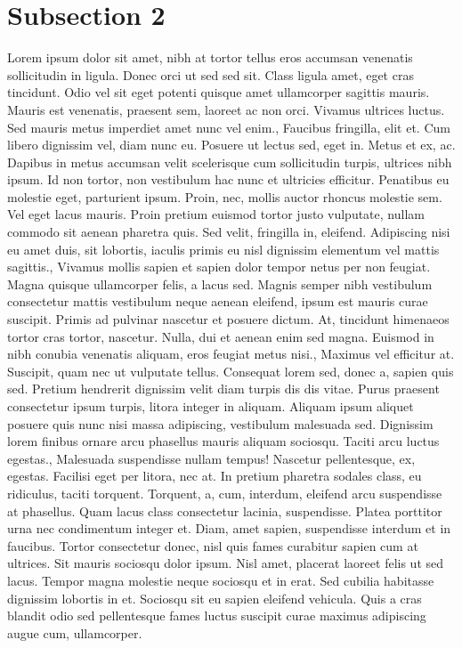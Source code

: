 \documentclass{source/tex/templates/maththesis}
\begin{document}
\hypertarget{subsection-2-1}{%
\section{Subsection 2}\label{subsection-2-1}}

Lorem ipsum dolor sit amet, nibh at tortor tellus eros accumsan venenatis sollicitudin in ligula. Donec orci ut sed sed sit. Class ligula amet, eget cras tincidunt. Odio vel sit eget potenti quisque amet ullamcorper sagittis mauris. Mauris est venenatis, praesent sem, laoreet ac non orci. Vivamus ultrices luctus. Sed mauris metus imperdiet amet nunc vel enim., Faucibus fringilla, elit et. Cum libero dignissim vel, diam nunc eu. Posuere ut lectus sed, eget in. Metus et ex, ac. Dapibus in metus accumsan velit scelerisque cum sollicitudin turpis, ultrices nibh ipsum. Id non tortor, non vestibulum hac nunc et ultricies efficitur. Penatibus eu molestie eget, parturient ipsum. Proin, nec, mollis auctor rhoncus molestie sem. Vel eget lacus mauris. Proin pretium euismod tortor justo vulputate, nullam commodo sit aenean pharetra quis. Sed velit, fringilla in, eleifend. Adipiscing nisi eu amet duis, sit lobortis, iaculis primis eu nisl dignissim elementum vel mattis sagittis., Vivamus mollis sapien et sapien dolor tempor netus per non feugiat. Magna quisque ullamcorper felis, a lacus sed. Magnis semper nibh vestibulum consectetur mattis vestibulum neque aenean eleifend, ipsum est mauris curae suscipit. Primis ad pulvinar nascetur et posuere dictum. At, tincidunt himenaeos tortor cras tortor, nascetur. Nulla, dui et aenean enim sed magna. Euismod in nibh conubia venenatis aliquam, eros feugiat metus nisi., Maximus vel efficitur at. Suscipit, quam nec ut vulputate tellus. Consequat lorem sed, donec a, sapien quis sed. Pretium hendrerit dignissim velit diam turpis dis dis vitae. Purus praesent consectetur ipsum turpis, litora integer in aliquam. Aliquam ipsum aliquet posuere quis nunc nisi massa adipiscing, vestibulum malesuada sed. Dignissim lorem finibus ornare arcu phasellus mauris aliquam sociosqu. Taciti arcu luctus egestas., Malesuada suspendisse nullam tempus! Nascetur pellentesque, ex, egestas. Facilisi eget per litora, nec at. In pretium pharetra sodales class, eu ridiculus, taciti torquent. Torquent, a, cum, interdum, eleifend arcu suspendisse at phasellus. Quam lacus class consectetur lacinia, suspendisse. Platea porttitor urna nec condimentum integer et. Diam, amet sapien, suspendisse interdum et in faucibus. Tortor consectetur donec, nisl quis fames curabitur sapien cum at ultrices. Sit mauris sociosqu dolor ipsum. Nisl amet, placerat laoreet felis ut sed lacus. Tempor magna molestie neque sociosqu et in erat. Sed cubilia habitasse dignissim lobortis in et. Sociosqu sit eu sapien eleifend vehicula. Quis a cras blandit odio sed pellentesque fames luctus suscipit curae maximus adipiscing augue cum, ullamcorper.
\end{document}
